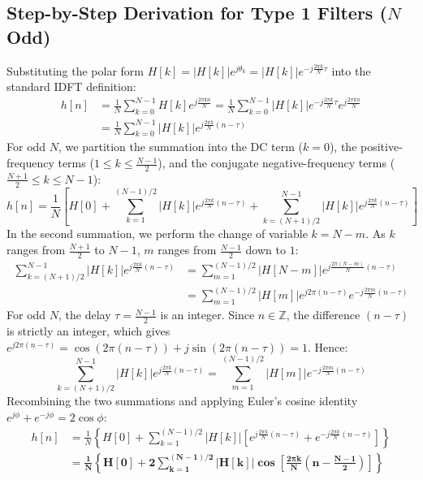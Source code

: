 \documentclass[11pt,a4paper]{article}
\begin{document}
\subsection{Step-by-Step Derivation for Type 1 Filters (\texorpdfstring{$N$}{N} Odd)}
Substituting the polar form $H[k] = |H[k]| e^{j\theta_k} = |H[k]| e^{-j \frac{2\pi k}{N}\tau}$ into the standard IDFT definition:
\begin{align}
h[n] &= \frac{1}{N} \sum_{k=0}^{N-1} H[k] e^{j\frac{2\pi kn}{N}} = \frac{1}{N} \sum_{k=0}^{N-1} |H[k]| e^{-j\frac{2\pi k}{N}\tau} e^{j\frac{2\pi kn}{N}} \nonumber \\
&= \frac{1}{N} \sum_{k=0}^{N-1} |H[k]| e^{j\frac{2\pi k}{N}(n - \tau)}
\end{align}
For odd $N$, we partition the summation into the DC term ($k=0$), the positive-frequency terms ($1 \le k \le \frac{N-1}{2}$), and the conjugate negative-frequency terms ($\frac{N+1}{2} \le k \le N-1$):
\begin{equation}
h[n] = \frac{1}{N} \left[ H[0] + \sum_{k=1}^{(N-1)/2} |H[k]| e^{j\frac{2\pi k}{N}(n - \tau)} + \sum_{k=(N+1)/2}^{N-1} |H[k]| e^{j\frac{2\pi k}{N}(n - \tau)} \right]
\end{equation}
In the second summation, we perform the change of variable $k = N - m$. As $k$ ranges from $\frac{N+1}{2}$ to $N-1$, $m$ ranges from $\frac{N-1}{2}$ down to $1$:
\begin{align}
\sum_{k=(N+1)/2}^{N-1} |H[k]| e^{j\frac{2\pi k}{N}(n - \tau)} &= \sum_{m=1}^{(N-1)/2} |H[N-m]| e^{j\frac{2\pi (N-m)}{N}(n - \tau)} \nonumber \\
&= \sum_{m=1}^{(N-1)/2} |H[m]| e^{j 2\pi(n - \tau)} e^{-j\frac{2\pi m}{N}(n - \tau)}
\end{align}
For odd $N$, the delay $\tau = \frac{N-1}{2}$ is an integer. Since $n \in \mathbb{Z}$, the difference $(n - \tau)$ is strictly an integer, which gives $e^{j 2\pi(n - \tau)} = \cos(2\pi(n-\tau)) + j\sin(2\pi(n-\tau)) = 1$. Hence:
\begin{equation}
\sum_{k=(N+1)/2}^{N-1} |H[k]| e^{j\frac{2\pi k}{N}(n - \tau)} = \sum_{m=1}^{(N-1)/2} |H[m]| e^{-j\frac{2\pi m}{N}(n - \tau)}
\end{equation}
Recombining the two summations and applying Euler's cosine identity $e^{j\phi} + e^{-j\phi} = 2\cos\phi$:
\begin{align}
h[n] &= \frac{1}{N} \left\{ H[0] + \sum_{k=1}^{(N-1)/2} |H[k]| \left[ e^{j\frac{2\pi k}{N}(n - \tau)} + e^{-j\frac{2\pi k}{N}(n - \tau)} \right] \right\} \nonumber \\
&= \mathbf{\frac{1}{N} \left\{ H[0] + 2 \sum_{k=1}^{(N-1)/2} |H[k]| \cos\left[ \frac{2\pi k}{N}\left(n - \frac{N-1}{2}\right) \right] \right\}}
\end{align}
\end{document}
